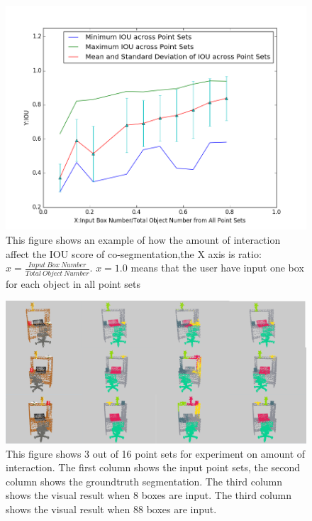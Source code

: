\begin{figure}
	\centering
	\includegraphics[width=\linewidth]{images/interact/IOU.png}
	\caption{This figure shows an example of how the amount of interaction affect the IOU score of co-segmentation,the X axis is ratio: $x=\frac{Input~Box~Number}{Total~Object~Number}$. $x=1.0$ means that the user have input one box for each object in all point sets}
	\label{fig:interact_number}
\end{figure}

\begin{figure}
	\centering
	\includegraphics[width=\linewidth]{images/interact/interact}
	\caption{This figure shows 3 out of 16 point sets for experiment on amount of interaction. The first column shows the input point sets, the second column shows the groundtruth segmentation. The third column shows the visual result when 8 boxes are input. The third column shows the visual result when 88 boxes are input. }
	\label{fig:interact_vis}
\end{figure}

